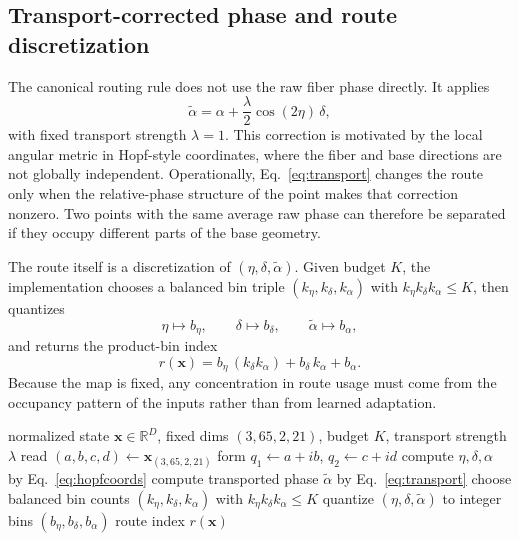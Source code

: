 \documentclass[10pt,letterpaper]{article}
\begin{document}
\subsection{Transport-corrected phase and route discretization}
The canonical routing rule does not use the raw fiber phase directly. It applies
\begin{equation}
\tilde{\alpha} = \alpha + \frac{\lambda}{2}\cos(2\eta)\,\delta,
\label{eq:transport}
\end{equation}
with fixed transport strength $\lambda=1$. This correction is motivated by the local angular metric in Hopf-style coordinates, where the fiber and base directions are not globally independent. Operationally, Eq.~\eqref{eq:transport} changes the route only when the relative-phase structure of the point makes that correction nonzero. Two points with the same average raw phase can therefore be separated if they occupy different parts of the base geometry.

The route itself is a discretization of $(\eta,\delta,\tilde{\alpha})$. Given budget $K$, the implementation chooses a balanced bin triple $(k_\eta,k_\delta,k_\alpha)$ with $k_\eta k_\delta k_\alpha \leq K$, then quantizes
\begin{equation}
\eta \mapsto b_\eta,\qquad \delta \mapsto b_\delta,\qquad \tilde{\alpha} \mapsto b_\alpha,
\end{equation}
and returns the product-bin index
\begin{equation}
r(\mathbf{x}) = b_\eta\,(k_\delta k_\alpha) + b_\delta\,k_\alpha + b_\alpha.
\end{equation}
Because the map is fixed, any concentration in route usage must come from the occupancy pattern of the inputs rather than from learned adaptation.

\begin{algorithm}[t]
\caption{Fixed angular routing used in the paper}
\label{alg:routing}
\begin{algorithmic}[1]
\Require normalized state $\mathbf{x}\in\mathbb{R}^D$, fixed dims $(3,65,2,21)$, budget $K$, transport strength $\lambda$
\State read $(a,b,c,d) \gets \mathbf{x}_{(3,65,2,21)}$
\State form $q_1 \gets a+ib$, $q_2 \gets c+id$
\State compute $\eta,\delta,\alpha$ by Eq.~\eqref{eq:hopfcoords}
\State compute transported phase $\tilde{\alpha}$ by Eq.~\eqref{eq:transport}
\State choose balanced bin counts $(k_\eta,k_\delta,k_\alpha)$ with $k_\eta k_\delta k_\alpha \leq K$
\State quantize $(\eta,\delta,\tilde{\alpha})$ to integer bins $(b_\eta,b_\delta,b_\alpha)$
\State \Return route index $r(\mathbf{x})$
\end{algorithmic}
\end{algorithm}
\end{document}
